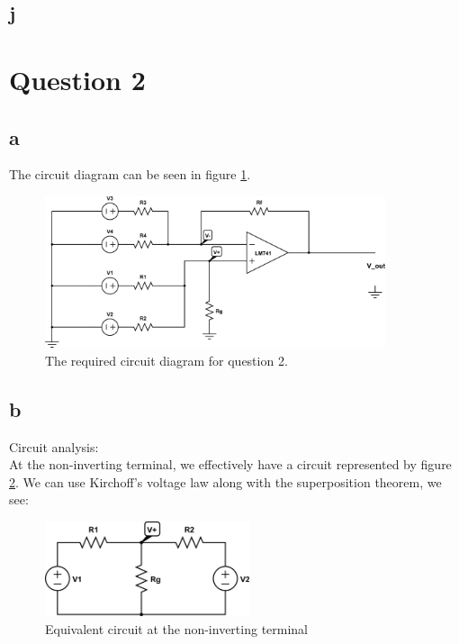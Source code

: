 \documentclass{article}
\theoremstyle{plain}
\theoremstyle{definition}
\theoremstyle{remark}
\begin{document}
\subsection*{j}

\section*{Question 2}

\subsection*{a}
The circuit diagram can be seen in figure \ref{q2_a}.
\begin{figure}[h]
\begin{center}
\includegraphics[width=10cm]{q2_circuitDiagram.png}
\end{center}
\caption{The required circuit diagram for question 2.}
\label{q2_a}
\end{figure}


\subsection*{b}
Circuit analysis:\\

At the non-inverting terminal, we effectively have a circuit represented by figure \ref{q2_b1}. We can use Kirchoff's voltage law along with the superposition theorem, we see:
\begin{figure}[h]
\begin{center}
\includegraphics[width=6cm]{lab1_q2_kvl1.png}
\end{center}
\caption{Equivalent circuit at the non-inverting terminal}
\label{q2_b1}
\end{figure}
\end{document}
